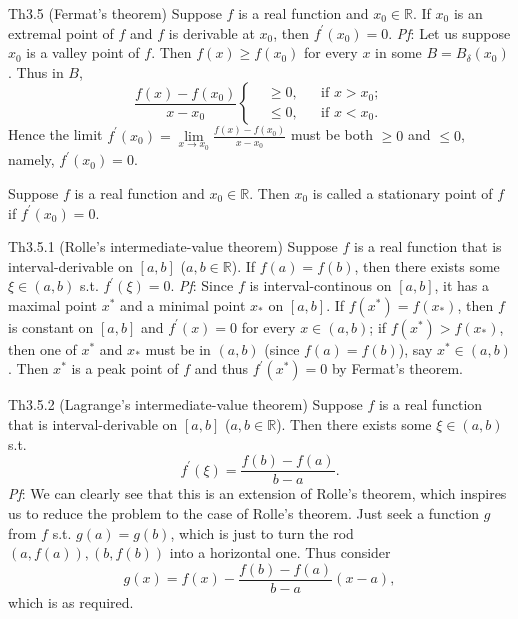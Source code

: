 \documentclass{article}
\begin{document}
\begin{Th}{Th3.5 (Fermat's theorem)}
    Suppose $f$ is a real function and $x_0\in\mathbb{R}$. If $x_0$ is an extremal point of $f$ and $f$ is derivable at $x_0$, then $f^\prime(x_0) = 0$.
    \tcblower
    \textit{Pf}: Let us suppose $x_0$ is a valley point of $f$. Then $f(x)\geq f(x_0)$ for every $x$ in some $B = B_\delta(x_0)$. Thus in $B$, 
    $$ \frac{f(x)-f(x_0)}{x-x_0} \left\{
        \begin{aligned}
            &\geq 0, && \text{if } x>x_0;\\
            &\leq 0, && \text{if } x<x_0.
        \end{aligned}\right.
    $$
    Hence the limit $f^\prime(x_0) = \lim\limits_{x\to x_0} \frac{f(x)-f(x_0)}{x-x_0}$ must be both $\geq 0$ and $\leq 0$, namely, $f^\prime(x_0) = 0$.
\end{Th}

\begin{Rmk}{}
    \textcolor{Df}{Suppose $f$ is a real function and $x_0\in\mathbb{R}$. Then $x_0$ is called a stationary point of $f$ if $f^\prime(x_0) = 0$.}
\end{Rmk}

\begin{Th}{Th3.5.1 (Rolle's intermediate-value theorem)}
    Suppose $f$ is a real function that is interval-derivable on $[a,b]$ ($a,b\in\mathbb{R}$). If $f(a) = f(b)$, then there exists some $\xi \in (a,b)$ s.t. $f^\prime(\xi) = 0$.
    \tcblower
    \textit{Pf}: Since $f$ is interval-continous on $[a,b]$, it has a maximal point $x^*$ and a minimal point $x_*$ on $[a,b]$. If $f(x^*) = f(x_*)$, then $f$ is constant on $[a,b]$ and $f^\prime(x) = 0$ for every $x\in (a,b)$; if $f(x^*) > f(x_*)$, then one of $x^*$ and $x_*$ must be in $(a,b)$ (since $f(a) = f(b)$), say $x^*\in (a,b)$. Then $x^*$ is a peak point of $f$ and thus $f^\prime(x^*) = 0$ by Fermat's theorem.
\end{Th}

\begin{Th}{Th3.5.2 (Lagrange's intermediate-value theorem)}
    Suppose $f$ is a real function that is interval-derivable on $[a,b]$ ($a,b\in\mathbb{R}$). Then there exists some $\xi\in (a,b)$ s.t.
    $$ f^\prime(\xi) = \frac{f(b)-f(a)}{b-a}. $$
    \tcblower
    \textit{Pf}: We can clearly see that this is an extension of Rolle's theorem, which inspires us to reduce the problem to the case of Rolle's theorem. Just seek a function $g$ from $f$ s.t. $g(a) = g(b)$, which is just to turn the rod $(a, f(a)), (b, f(b))$ into a horizontal one. Thus consider
    $$ g(x) = f(x) - \frac{f(b)-f(a)}{b-a}(x-a), $$
    which is as required. 
\end{Th}
\end{document}
